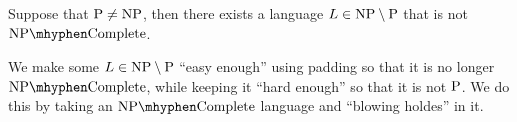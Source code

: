 \begin{note}
  Suppose that $\mathrm{P} \neq \mathrm{NP}$, then there exists a language
  $L \in \mathrm{NP} \setminus \mathrm{P}$ that is not $\NPC$.
\end{note}

\begin{note}
  We make some $L \in \mathrm{NP} \setminus \mathrm{P}$ ``easy enough'' using padding so
  that it is no longer $\NPC$, while keeping it ``hard enough'' so that it is
  not $\mathrm{P}$.
  We do this by taking an $\NPC$ language and ``blowing holdes'' in it.
\end{note}
